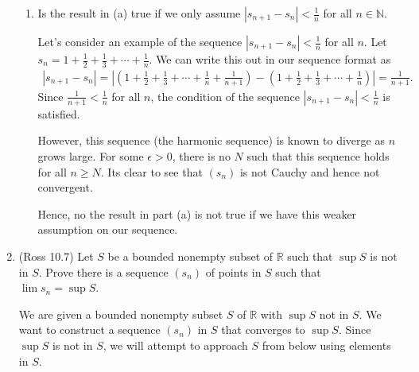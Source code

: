 \documentclass [10pt]{article}
\newcommand{\jg}[1]{{\color{blue} #1}}
\begin{document}
\begin{enumerate}
\begin{enumerate}
\item Is the result in (a) true if we only assume $|s_{n+1} -s_n| < \frac{1}{n}$ for all $n \in \mathbb{N}$.

\jg{
Let's consider an example of the sequence $|s_{n+1} - s_n| < \frac{1}{n}$ for all $n$. Let $s_n = 1 + \frac{1}{2} + \frac{1}{3} + \cdots + \frac{1}{n}$. We can write this out in our sequence format as
\begin{align*}
    |s_{n+1} - s_n| = \left| \left( 1 + \frac{1}{2} + \frac{1}{3} + \cdots + \frac{1}{n} + \frac{1}{n+1} \right) - \left( 1 + \frac{1}{2} + \frac{1}{3} + \cdots + \frac{1}{n}\right) \right| = \frac{1}{n+1}.
\end{align*}
Since $\frac{1}{n+1} < \frac{1}{n}$ for all $n$, the condition of the sequence $|s_{n+1} - s_n| < \frac{1}{n}$ is satisfied. 

However, this sequence (the harmonic sequence) is known to diverge as $n$ grows large. For some $\epsilon > 0$, there is no $N$ such that this sequence holds for all $n \geq N$. Its clear to see that $(s_n)$ is not Cauchy and hence not convergent. 

Hence, no the result in part (a) is not true if we have this weaker assumption on our sequence. 
}
\end{enumerate}
\clearpage

\item (Ross 10.7) Let $S$ be a bounded nonempty subset of $\mathbb{R}$ such that $\sup S$ is not in $S$. Prove there is a sequence $(s_n)$ of points in $S$ such that $\lim s_n = \sup S$.

\jg{
We are given a bounded nonempty subset $S$ of $\mathbb{R}$ with $\sup S$ not in $S$. We want to construct a sequence $(s_n)$ in $S$ that converges to $\sup S$. Since $\sup S$ is not in $S$, we will attempt to approach $S$ from below using elements in $S$. 

}
\end{enumerate}
\end{document}
